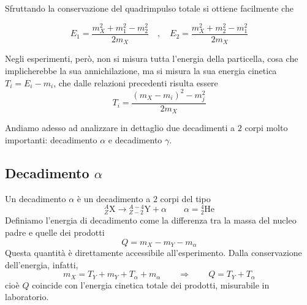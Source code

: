 Sfruttando la conservazione del quadrimpulso totale si ottiene facilmente che 

\begin{tcolorbox}[colback=black!5!white, colframe=black!45!white, boxrule=0.8pt]
\begin{equation}
    E_1 = \frac{m_X^2 + m_1^2 - m_2^2}{2 m_X} \quad , \quad E_2 = \frac{m_X^2 + m_2^2 - m_1^2}{2m_X}
\end{equation}
\end{tcolorbox}
%
Negli esperimenti, però, non si misura tutta l'energia della particella, cosa che implicherebbe la sua annichilazione, ma si misura la sua energia cinetica $T_i = E_i - m_i$, che dalle relazioni precedenti risulta essere
%
\begin{equation}
    T_i = \frac{(m_X - m_i)^2 - m_j^2}{2m_X}
\end{equation}

Andiamo adesso ad analizzare in dettaglio due decadimenti a $2$ corpi molto importanti: decadimento $\alpha$ e decadimento $\gamma$.

\subsection{Decadimento $\alpha$}

Un decadimento $\alpha$ è un decadimento a $2$ corpi del tipo 
%
\begin{equation*}
    {}^{A}_{Z}\mathrm{X} \longrightarrow {}^{A-4}_{Z-2}\mathrm{Y} + \alpha \qquad \alpha = {}^{4}_{2}\mathrm{He}
\end{equation*}
Definiamo l'energia di decadimento come la differenza tra la massa del nucleo padre e quelle dei prodotti
%
\begin{equation}
    Q = m_X - m_Y - m_{\alpha}
\end{equation}
Questa quantità è direttamente accessibile all'esperimento. Dalla conservazione dell'energia, infatti, 
%
\begin{equation}
    m_X = T_Y + m_Y + T_{\alpha} + m_{\alpha} \qquad \Longrightarrow \qquad Q = T_Y + T_{\alpha}
\end{equation}
cioè $Q$ coincide con l'energia cinetica totale dei prodotti, misurabile in laboratorio.\\

